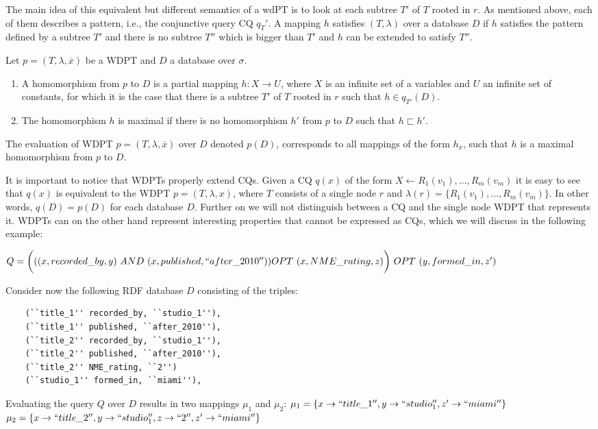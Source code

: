 The main idea of this equivalent but different semantics of a wdPT is to look at each subtree $T'$ of
$T$ rooted in $r$. As mentioned above, each of them describes a pattern, i.e.,
the conjunctive query CQ $q_T'$. A mapping $h$ satisfies $(T,\lambda)$ over
a database $D$ if $h$ satisfies the pattern defined by a subtree $T'$ and there
is no subtree $T''$ which is bigger than $T'$ and $h$ can be extended to satisfy
$T''$.
\begin{definition}
	Let $p=(T,\lambda,\overline{x})$ be a WDPT and $D$ a database over $\sigma$.

	\begin{enumerate}
		\item A homomorphism from $p$ to $D$ is a partial mapping $h: X \rightarrow U$,
			where $X$ is an infinite set of a variables and $U$ an infinite set of
			constants, for which it is the case that there is a subtree $T'$ of $T$ rooted
			in $r$ such that $h \in q_{T'}(D)$.
		\item The homomorphism $h$ is maximal if there is no homomorphism $h'$ from $p$
			to $D$ such that $h \sqsubset h'$.
	\end{enumerate}
	The evaluation of WDPT $p = (T,\lambda,\overline{x})$ over $D$ denoted $p(D)$,
	corresponds to all mappings of the form $h_{\overline{x}}$, such that $h$ is a
	maximal homomorphism from $p$ to $D$.
\end{definition}

It is important to notice that WDPTs properly extend CQs.
Given a CQ $q(x)$ of the form $X \leftarrow R_1(v_1),\dots,R_m(v_m)$
it is easy to see that $q(x)$ is equivalent to the WDPT $p = (T,\lambda,x)$,
where $T$ consists of a single node $r$ and $\lambda(r) =
\{R_1(v_1),\dots,R_m(v_m)\}$. In other words, $q(D) = p(D)$ for each database
$D$. Further on we will not distinguish between a CQ and the single node WDPT
that represents it. WDPTs can on the other hand represent interesting properties
that cannot be expressed as CQs, which we will discuss in the following example:
\begin{example}
	$Q =  \bigg(((x,recorded\_by,y) \ AND \ (x,published, ``after\_2010'')) \ \\ OPT \ (x,
	NME\_rating,z)\bigg) \ OPT \ (y, formed\_in, z') $

	\noindent Consider now the following RDF database $D$ consisting of the triples:
	\begin{verbatim}
	(``title_1'' recorded_by, ``studio_1''),
	(``title_1'' published, ``after_2010''),
	(``title_2'' recorded_by, ``studio_1''),
	(``title_2'' published, ``after_2010''),
	(``title_2'' NME_rating, ``2'')
	(``studio_1'' formed_in, ``miami''),
	\end{verbatim}
	Evaluating the query $Q$ over $D$ results in two mappings $\mu_1$ and $\mu_2$:
	$\mu_1 = \{ x \rightarrow ``title\_1'', y \rightarrow ``studio_1'',z'
	\rightarrow ``miami'' \}$ 
	$\mu_2 = \{ x \rightarrow ``title\_2'', y \rightarrow ``studio_1'',z\rightarrow
	``2'', z' \rightarrow ``miami'' \}$ 
\end{example}

